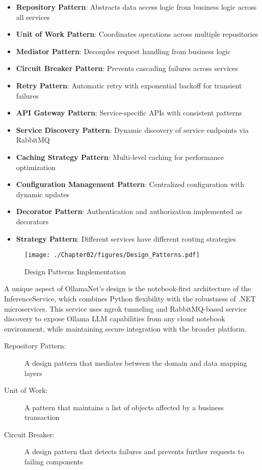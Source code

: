 \begin{itemize}
    \item \textbf{Repository Pattern}: Abstracts data access logic from business logic across all services
    \item \textbf{Unit of Work Pattern}: Coordinates operations across multiple repositories
    \item \textbf{Mediator Pattern}: Decouples request handling from business logic
    \item \textbf{Circuit Breaker Pattern}: Prevents cascading failures across services
    \item \textbf{Retry Pattern}: Automatic retry with exponential backoff for transient failures
    \item \textbf{API Gateway Pattern}: Service-specific APIs with consistent patterns
    \item \textbf{Service Discovery Pattern}: Dynamic discovery of service endpoints via RabbitMQ
    \item \textbf{Caching Strategy Pattern}: Multi-level caching for performance optimization
    \item \textbf{Configuration Management Pattern}: Centralized configuration with dynamic updates
    \item \textbf{Decorator Pattern}: Authentication and authorization implemented as decorators
    \item \textbf{Strategy Pattern}: Different services have different routing strategies
\end{itemize}

\begin{sidewaysfigure}[p]
    \centering
    \texttt{[image: ./Chapter02/figures/Design\_Patterns.pdf]}
    \caption{Design Patterns Implementation}
    \label{fig:design-patterns}
\end{sidewaysfigure}
\clearpage

A unique aspect of OllamaNet's design is the notebook-first architecture of the InferenceService, which combines Python flexibility with the robustness of .NET microservices. This service uses ngrok tunneling and RabbitMQ-based service discovery to expose Ollama LLM capabilities from any cloud notebook environment, while maintaining secure integration with the broader platform.

\begin{terminology}
\begin{description}
    \item[Repository Pattern:] A design pattern that mediates between the domain and data mapping layers
    \item[Unit of Work:] A pattern that maintains a list of objects affected by a business transaction
    \item[Circuit Breaker:] A design pattern that detects failures and prevents further requests to failing components
\end{description}
\end{terminology}






